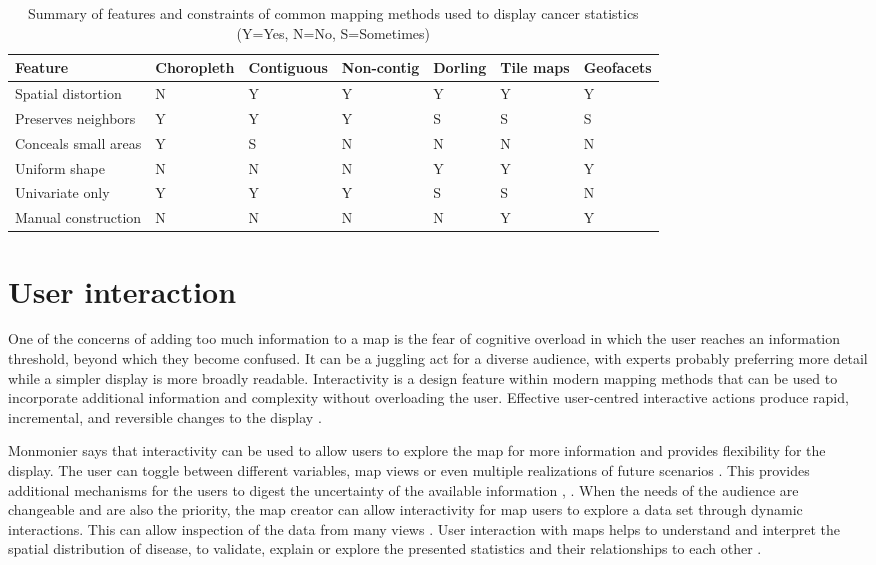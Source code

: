 \documentclass{monashthesis}
\begin{document}
\begin{table}

\caption{\label{tab:methods}Summary of features and constraints of common mapping methods used to display cancer statistics (Y=Yes, N=No, S=Sometimes) }
\centering
\begin{tabular}[t]{>{\raggedright\arraybackslash}p{7em}llllll}
\toprule
Feature & Choropleth & Contiguous & Non-contig & Dorling & Tile maps & Geofacets\\
\midrule
Spatial distortion & N & Y & Y & Y & Y & Y\\
Preserves neighbors & Y & Y & Y & S & S & S\\
Conceals small areas & Y & S & N & N & N & N\\
Uniform shape & N & N & N & Y & Y & Y\\
Univariate only & Y & Y & Y & S & S & N\\
Manual construction & N & N & N & N & Y & Y\\
\bottomrule
\end{tabular}
\end{table}

\hypertarget{ch:interacting}{%
\section{User interaction}\label{ch:interacting}}

One of the concerns of adding too much information to a map is the fear of cognitive overload \autocite{mcgranaghan1993cartographic} in which the user reaches an information threshold, beyond which they become confused. It can be a juggling act for a diverse audience, with experts probably preferring more detail \autocite{cliburn2002design} while a simpler display is more broadly readable. Interactivity is a design feature within modern mapping methods that can be used to incorporate additional information and complexity without overloading the user. Effective user-centred interactive actions produce rapid, incremental, and reversible changes to the display \autocite{DMIV}.

Monmonier \autocite{HTLWM} says that interactivity can be used to allow users to explore the map for more information and provides flexibility for the display. The user can toggle between different variables, map views or even multiple realizations of future scenarios \autocite{goodchild1994introduction}. This provides additional mechanisms for the users to digest the uncertainty of the available information \autocite{maceachren1992visualizing}, \autocite{van1994visualization}. When the needs of the audience are changeable and are also the priority, the map creator can allow interactivity for map users to explore a data set through dynamic interactions. This can allow inspection of the data from many views \autocite{DQBCM}. User interaction with maps helps to understand and interpret the spatial distribution of disease, to validate, explain or explore the presented statistics and their relationships to each other \autocite{TNTEA}.
\end{document}
